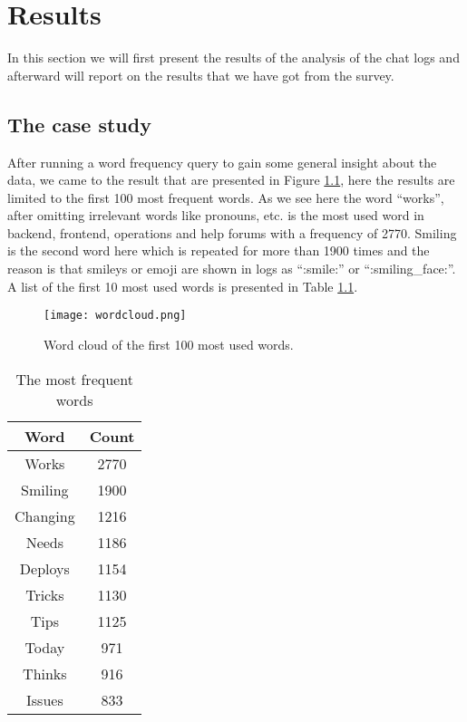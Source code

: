 \chapter{Results}
In this section we will first present the results of the analysis of the chat logs and afterward will report on the results that we have got from the survey.

\section{The case study}

After running a word frequency query to gain some general insight about the data, we came to the result that are presented in Figure \ref{fig:wordcloud}, here the results are limited to the first 100 most frequent words. As we see here the word “works”, after omitting irrelevant words like pronouns, etc. is the most used word in backend, frontend, operations and help forums with a frequency of 2770. Smiling is the second word here which is repeated for more than 1900 times and the reason is that smileys or emoji are shown in logs as “:smile:” or “:smiling\_face:”. A list of the first 10 most used words is presented in Table \ref{table:word}.

\begin{figure}[hbt!]
\centering
\texttt{[image: wordcloud.png]}
\caption{Word cloud of the first 100 most used words.}\label{fig:wordcloud}
\end{figure}



\begin{table}
\centering
\caption{The most frequent words} \label{table:word}
\begin{tabular}{cc}
\hline
\textbf{Word} & \textbf{Count} \\ \hline
Works & 2770 \\
Smiling & 1900 \\
Changing & 1216 \\
Needs & 1186 \\
Deploys & 1154 \\
Tricks & 1130 \\
Tips & 1125 \\
Today & 971 \\
Thinks & 916 \\
Issues & 833 \\
\hline
\end{tabular}
\end{table}


